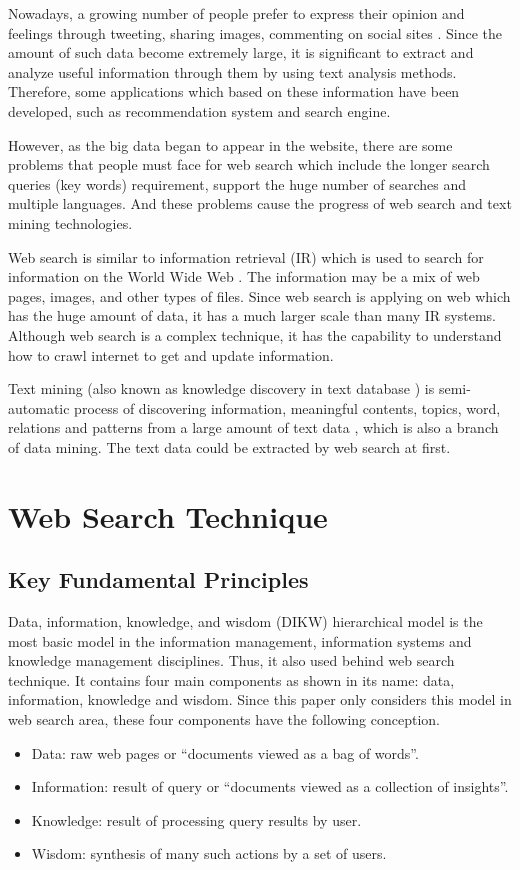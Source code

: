 \documentclass[sigconf]{acmart}
\begin{document}
Nowadays, a growing number of people prefer to express their opinion and feelings through tweeting, sharing images, commenting on social sites \cite{editor01}. Since the amount of such data become extremely large, it is significant to extract and analyze useful information through them by using text analysis methods. Therefore, some applications which based on these information have been developed, such as recommendation system and search engine.

However, as the big data began to appear in the website, there are some problems that people must face for web search which include the longer search queries (key words) requirement, support the huge number of searches and multiple languages. And these problems cause the progress of web search and text mining technologies.

Web search is similar to information retrieval (IR) which is used to search for information on the World Wide Web \cite{editor05}. The information may be a mix of web pages, images, and other types of files. Since web search is applying on web which has the huge amount of data, it has a much larger scale than many IR systems. Although web search is a complex technique, it has the capability to understand how to crawl internet to get and update information.

Text mining (also known as knowledge discovery in text database \cite{editor04}) is semi-automatic process of discovering information, meaningful contents, topics, word, relations and patterns from a large amount of text data \cite{editor01}, which is also a branch of data mining. The text data could be extracted by web search at first.

\section{Web Search Technique}

\subsection{Key Fundamental Principles}

Data, information, knowledge, and wisdom (DIKW) hierarchical model is the most basic model in the information management, information systems and knowledge management disciplines. Thus, it also used behind web search technique. It contains four main components as shown in its name: data, information, knowledge and wisdom. Since this paper only considers this model in web search area, these four components have the following conception.
\begin{itemize}
\item Data: raw web pages or ``documents viewed as a bag of words''.
\item Information: result of query or ``documents viewed as a collection of insights''.
\item Knowledge: result of processing query results by user.
\item Wisdom: synthesis of many such actions by a set of users.
\end{itemize}
\end{document}
